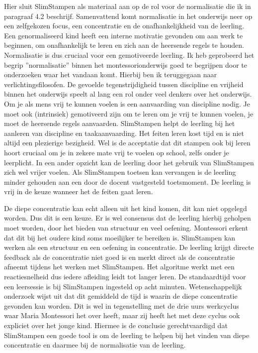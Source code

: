 \documentclass[12pt, a4paper]{article}
\begin{document}
Hier sluit SlimStampen als materiaal aan op de rol voor de normalisatie die ik in paragraaf 4.2 beschrijf. Samenvattend komt normalisatie in het onderwijs neer op een zelfgekozen focus, een concentratie en de onafhankelijkheid van de leerling. Een genormaliseerd kind heeft een interne motivatie gevonden om aan werk te beginnen, om onafhankelijk te leren en zich aan de heersende regels te houden. Normalisatie is dus cruciaal voor een gemotiveerde leerling. Ik heb geprobeerd het begrip ''normalisatie'' binnen het montessorionderwijs goed te begrijpen door te onderzoeken waar het vandaan komt. Hierbij ben ik teruggegaan naar verlichtingsfilosofen. De gevoelde tegenstrijdigheid tussen discipline en vrijheid binnen het onderwijs speelt al lang een rol onder veel denkers over het onderwijs. Om je als mens vrij te kunnen voelen is een aanvaarding van discipline nodig. Je moet ook (intrinsiek) gemotiveerd zijn om te leren om je vrij te kunnen voelen, je moet de heersende regels aanvaarden. SlimStampen helpt de leerling bij het aanleren van discipline en taakaanvaarding. Het feiten leren kost tijd en is niet altijd een plezierige bezigheid. Wel is de acceptatie dat dit stampen ook bij leren hoort cruciaal om je in zekere mate vrij te voelen op school, zelfs onder je leerplicht. In een ander opzicht kan de leerling door het gebruik van SlimStampen zich wel vrijer voelen. Als SlimStampen toetsen kan vervangen is de leerling minder gehouden aan een door de docent vastgesteld toetsmoment. De leerling is vrij in de keuze wanneer het de feiten gaat leren. 

De diepe concentratie kan echt alleen uit het kind komen, dit kan niet opgelegd worden. Dus dit is een keuze. Er is wel consensus dat de leerling hierbij geholpen moet worden, door het bieden van structuur en veel oefening. Montessori erkent dat dit bij het oudere kind soms moeilijker te bereiken is. SlimStampen kan werken als een structuur en een oefening in concentratie. De leerling krijgt directe feedback als de concentratie niet goed is en merkt direct als de concentratie afneemt tijdens het werken met SlimStampen. Het algoritme werkt met een reactiesnelheid dus iedere afleiding leidt tot langer leren. De standaardtijd voor een leersessie is bij SlimStampen ingesteld op acht minuten. Wetenschappelijk onderzoek wijst uit dat dit gemiddeld de tijd is waarin de diepe concentratie gevonden kan worden. Dit is wel in tegenstelling met de drie uurs werkcyclus waar Maria Montessori het over heeft, maar zij heeft het met deze cyclus ook expliciet over het jonge kind. Hiermee is de conclusie gerechtvaardigd dat SlimStampen een goede tool is om de leerling te helpen bij het vinden van diepe concentratie en daarmee bij de normalisatie van de leerling.
\end{document}
